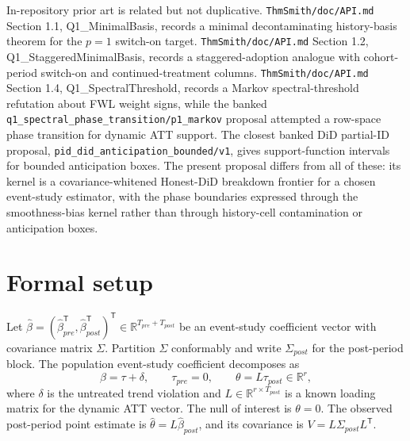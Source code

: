 \documentclass[11pt]{article}
\newcommand{\transpose}{\mathsf{T}}
\newcommand{\R}{\mathbb{R}}
\theoremstyle{definition}
\theoremstyle{plain}
\theoremstyle{remark}
\begin{document}
In-repository prior art is related but not duplicative.
\texttt{ThmSmith/doc/API.md} Section 1.1, Q1\_MinimalBasis, records a minimal decontaminating history-basis theorem for the \(p=1\) switch-on target.
\texttt{ThmSmith/doc/API.md} Section 1.2, Q1\_StaggeredMinimalBasis, records a staggered-adoption analogue with cohort-period switch-on and continued-treatment columns.
\texttt{ThmSmith/doc/API.md} Section 1.4, Q1\_SpectralThreshold, records a Markov spectral-threshold refutation about FWL weight signs, while the banked \texttt{q1\_spectral\_phase\_transition/p1\_markov} proposal attempted a row-space phase transition for dynamic ATT support.
The closest banked DiD partial-ID proposal, \texttt{pid\_did\_anticipation\_bounded/v1}, gives support-function intervals for bounded anticipation boxes.
The present proposal differs from all of these: its kernel is a covariance-whitened Honest-DiD breakdown frontier for a chosen event-study estimator, with the phase boundaries expressed through the smoothness-bias kernel rather than through history-cell contamination or anticipation boxes.

\section{Formal setup}
Let \(\widehat\beta=(\widehat\beta_{pre}^\transpose,\widehat\beta_{post}^\transpose)^\transpose\in\R^{T_{pre}+T_{post}}\) be an event-study coefficient vector with covariance matrix \(\Sigma\).
Partition \(\Sigma\) conformably and write \(\Sigma_{post}\) for the post-period block.
The population event-study coefficient decomposes as
\[
  \beta=\tau+\delta,\qquad \tau_{pre}=0,\qquad \theta=L\tau_{post}\in\R^r,
\]
where \(\delta\) is the untreated trend violation and \(L\in\R^{r\times T_{post}}\) is a known loading matrix for the dynamic ATT vector.
The null of interest is \(\theta=0\).
The observed post-period point estimate is \(\widehat\theta=L\widehat\beta_{post}\), and its covariance is \(V=L\Sigma_{post}L^\transpose\).
\end{document}
